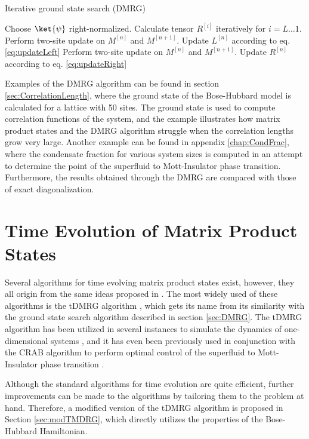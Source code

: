 \begin{algorithm}
\begin{algorithmic}
\caption{Iterative ground state search (DMRG)}
\State Choose $\ket{\psi}$ right-normalized.
\State Calculate tensor $R^{[i]}$ iteratively for $i = L \ldots 1$.
	 
		\State Perform two-site update on $M^{[n]}$ and $M^{[n+1]}$.
		\State Update $L^{[n]}$ according to eq. \eqref{eq:updateLeft}
	\EndFor
	 
		\State Perform two-site update on $M^{[n]}$ and $M^{[n+1]}$.
		\State Update $R^{[n]}$ according to eq. \eqref{eq:updateRight}
	\EndFor
\EndWhile
\end{algorithmic}
\end{algorithm}

Examples of the DMRG algorithm can be found in section \ref{sec:CorrelationLength}, where the ground state of the Bose-Hubbard model is calculated for a lattice with 50 sites. The ground state is used to compute correlation functions of the system, and the example illustrates how matrix product states and the DMRG algorithm struggle when the correlation lengths grow very large. Another example can be found in appendix \ref{chap:CondFrac}, where the condensate fraction for various system sizes is computed in an attempt to determine the point of the superfluid to Mott-Insulator phase transition. Furthermore, the results obtained through the DMRG are compared with those of exact diagonalization.


\section{Time Evolution of Matrix Product States}
Several algorithms for time evolving matrix product states exist, however, they all origin from the same ideas proposed in \cite{Vidal2003,Vidal2004}. The most widely used of these algorithms is the tDMRG algorithm \cite{Daley2004}, which gets its name from its similarity with the ground state search algorithm described in section \ref{sec:DMRG}. The tDMRG algorithm has been utilized in several instances to simulate the dynamics of one-dimensional systems \cite{Verstraete2004,Vznidarivc2008,Cazalilla2002}, and it has even been previously used in conjunction with the CRAB algorithm to perform optimal control of the superfluid to Mott-Insulator phase transition \cite{FrankBloch,Doria2011}.

Although the standard algorithms for time evolution are quite efficient, further improvements can be made to the algorithms by tailoring them to the problem at hand. Therefore, a modified version of the tDMRG algorithm is proposed in Section \ref{sec:modTMDRG}, which directly utilizes the properties of the Bose-Hubbard Hamiltonian.


